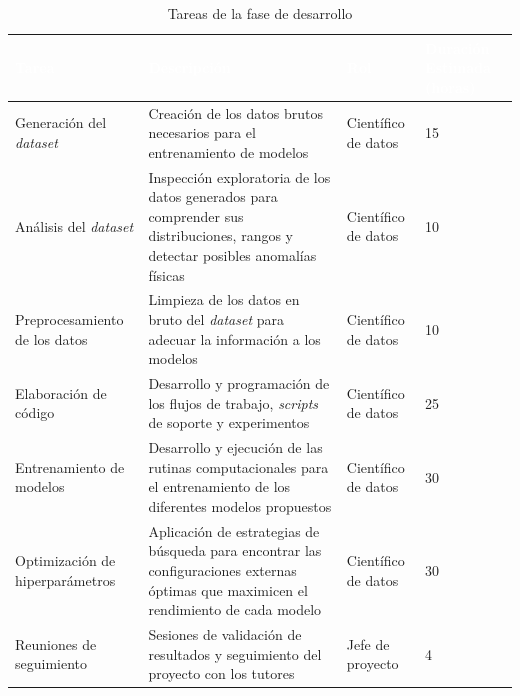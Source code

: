 \begin{table}[htp]
	\centering
	\begin{tabular}{ | m{4cm} | m{6cm} | m{2cm} | m{2cm} | }
		\hline
		\rowcolor[HTML]{5B9BD5} 
		\textcolor{white}{\textbf{Tarea}} & \textcolor{white}{\textbf{Descripción}} & \textcolor{white}{\textbf{Rol}} & \textcolor{white}{\textbf{Duración Estimada (horas)}} \\
		\hline
		
		Generación del \textit{dataset} & Creación de los datos brutos necesarios para el entrenamiento de modelos & Científico de datos & 15 \\
		\hline
		Análisis del \textit{dataset} & Inspección exploratoria de los datos generados para comprender sus distribuciones, rangos y detectar posibles anomalías físicas & Científico de datos & 10 \\
		\hline
		Preprocesamiento de los datos & Limpieza de los datos en bruto del \textit{dataset} para adecuar la información a los modelos & Científico de datos & 10 \\
		\hline
		Elaboración de código & Desarrollo y programación de los flujos de trabajo, \textit{scripts} de soporte y experimentos & Científico de datos & 25 \\
		\hline
		Entrenamiento de modelos & Desarrollo y ejecución de las rutinas computacionales para el entrenamiento de los diferentes modelos propuestos  & Científico de datos & 30 \\
		\hline
		Optimización de hiperparámetros & Aplicación de estrategias de búsqueda para encontrar las configuraciones externas óptimas que maximicen el rendimiento de cada modelo & Científico de datos & 30 \\
		\hline
		Reuniones de seguimiento & Sesiones de validación de resultados y seguimiento del proyecto con los tutores & Jefe de proyecto & 4 \\
		\hline
		
	\end{tabular} 
	
	\caption{Tareas de la fase de desarrollo}
\end{table}